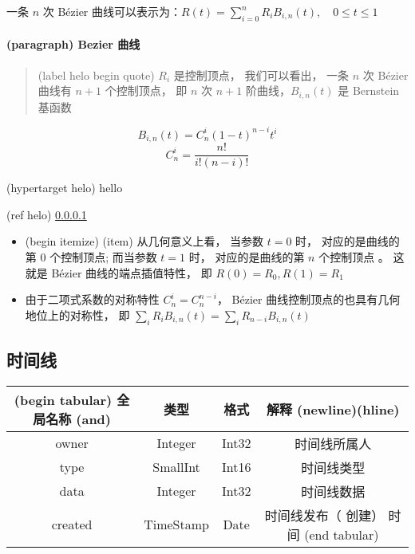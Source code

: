 \documentclass[11pt]{article}
\begin{document}
一条 $n$ 次 Bézier 曲线可以表示为：$R(t)=\sum_{i=0}^n R_iB_{i,n}(t),\quad 0\leq t\leq 1$

\paragraph{(paragraph) Bezier 曲线}

\label{helo} \begin{quote}
(label helo begin quote) $R_i$ 是控制顶点， 我们可以看出， 一条 $n$ 次 Bézier 曲线有 $n+1$ 个控制顶点， 即 $n$ 次 $n+1$ 阶曲线，$B_{i,n}(t)$ 是 Bernstein 基函数
\end{quote}

\begin{equation}
B_{i,n}(t)=C_n^i(1-t)^{n-i}t^i
\end{equation}
\begin{equation}
C_n^i=\frac{n!}{i!(n-i)!}
\end{equation}

\hypertarget{helo}{(hypertarget helo) hello} (ref helo) \ref{helo}

\begin{itemize}
	\item (begin itemize) (item) 从几何意义上看， 当参数 $t=0$ 时， 对应的是曲线的第 $0$ 个控制顶点;  而当参数 $t=1$ 时， 对应的是曲线的第 $n$ 个控制顶点 。 这就是 Bézier 曲线的端点插值特性， 即 $R(0)=R_0, R(1)=R_1$
	\item 由于二项式系数的对称特性 $C_n^i=C_n^{n-i}$， Bézier 曲线控制顶点的也具有几何地位上的对称性， 即 $\sum_iR_iB_{i,n}(t)=\sum_iR_{n-i}B_{i,n}(t)$
\end{itemize}

\subsection{时间线}
\begin{tabular}{|c|c|c|c|}
\hline
(begin tabular) 全局名称 (and)& 类型 & 格式 & 解释 (newline)(hline)\\
\hline
owner & Integer & Int32 & 时间线所属人 \\
\hline
type & SmallInt & Int16 & 时间线类型 \\
\hline
data & Integer & Int32 & 时间线数据 \\
\hline
created & TimeStamp & Date & 时间线发布（ 创建） 时间 (end tabular) \\
\hline
\end{tabular}

\bigskip
\end{document}
